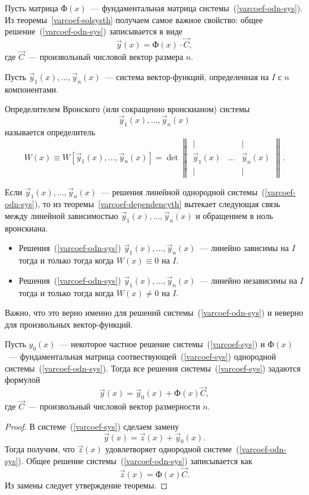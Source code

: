 Пусть матрица $\text{Ф}(x)$~--- фундаментальная матрица системы~(\ref{varcoef-odn-sys}). Из теоремы~\ref{varcoef-solsysth} получаем самое важное свойство: общее решение~(\ref{varcoef-odn-sys}) записывается в виде \[\vec{y}(x) = \text{Ф}(x) \cdot \vec{C},\]
где $\vec{C}$~--- произвольный числовой вектор размера $n$.

Пусть \(\vec{y}_1(x), \ldots, \vec{y}_n(x)\)~--- система вектор-функций, определенная на $I$ с $n$ компонентами. 

\begin{definition}
Определителем Вронского (или сокращенно вронскианом) системы \[\vec{y}_1(x), \ldots, \vec{y}_n(x)\] называется определитель
\[W(x) \equiv W[\vec{y}_1(x), \ldots, \vec{y}_n(x)] = \det
\begin{Vmatrix}
| &  & |\\
 \vec{y}_1(x) & \ldots &  \vec{y}_n(x)\\
| &  & |
\end{Vmatrix}.\]
\end{definition}

Если \( \vec{y}_1(x), \ldots,  \vec{y}_n(x)\)~--- решения линейной однородной системы~(\ref{varcoef-odn-sys}), то из теоремы~\ref{varcoef-dependencyth} вытекает следующая связь между линейной зависимостью \(\vec{y}_1(x), \ldots, \vec{y}_n(x)\) и обращением в ноль вронскиана. 

\begin{itemize}
    \item Решения~(\ref{varcoef-odn-sys}) \(\vec{y}_1(x), \ldots, \vec{y}_n(x)\)~--- линейно зависимы на $I$ тогда и только тогда когда $W(x) \equiv 0$ на $I$.
    \item Решения~(\ref{varcoef-odn-sys}) \(\vec{y}_1(x), \ldots, \vec{y}_n(x)\)~--- линейно независимы на $I$ тогда и только тогда когда $W(x) \neq 0$ на $I$.
\end{itemize}

Важно, что это верно именно для решений системы~(\ref{varcoef-odn-sys}) и неверно для произвольных вектор-функций.

\begin{theorem}\label{varcoef-neodnor-structure}
Пусть $y_0(x)$~--- некоторое частное решение системы~(\ref{varcoef-sys}) и $\text{Ф}(x)$~--- фундаментальная матрица соотвествующей~(\ref{varcoef-sys}) однородной системы~(\ref{varcoef-odn-sys}). Тогда все решения системы~(\ref{varcoef-sys}) задаются формулой
\[
\vec{y}(x) = \vec{y}_0(x) + \text{Ф}(x) \vec{C},
\]
где $\vec{C}$~--- произвольный числовой вектор размерности $n$.
\end{theorem}
\begin{proof}
В системе~(\ref{varcoef-sys}) сделаем замену 
\[\vec{y}(x) = \vec{z}(x) + \vec{y}_0(x).\]
Тогда получим, что $\vec{z}(x)$ удовлетворяет однородной системе~(\ref{varcoef-odn-sys}). Общее решение системы~(\ref{varcoef-odn-sys}) записывается как 
\begin{equation}
    \vec{z}(x)  = \text{Ф}(x) \vec{C}.
\end{equation}
Из замены следует утверждение теоремы.
\end{proof}
